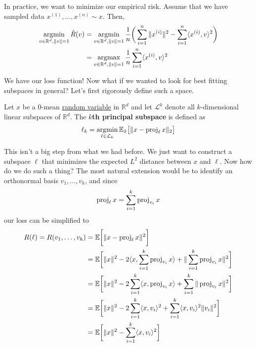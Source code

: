   In practice, we want to minimize our empirical risk. Assume that we have sampled data $x^{(1)}, \ldots, x^{(n)} \sim x$. Then, 
  \begin{align} 
    \operatorname*{\arg\!\min}_{v \in \mathbb{R}^{d}, \|v\| = 1} \hat{R}(v) 
    & =  \operatorname*{\arg\!\min}_{v \in \mathbb{R}^{d}, \|v\| = 1} \frac{1}{n} \bigg( \sum_{i = 1}^n \|x^{(i)} \|^2 - \sum_{i=1}^n \langle x^{(i)}, v \rangle^2 \bigg) \\ 
    & = \operatorname*{\arg\!\max}_{v \in \mathbb{R}^{d}, \|v\| = 1} \frac{1}{n} \sum_{i=1}^n \langle x^{(i)}, v \rangle^2 
  \end{align} 

  We have our loss function! Now what if we wanted to look for best fitting subspaces in general? Let's first rigorously define such a space. 

  \begin{definition}
    \label{def:principal-subspace}
 
    Let $x$ be a $0$-mean \hyperref[prob-def:random-variable]{random variable} in $\mathbb{R}^d$ and let $\mathcal{L}^k$ denote all $k$-dimensional linear subspaces of $\mathbb{R}^d$. The \textbf{$k$th principal subspace} is defined as 
    \begin{equation}
      \ell_k = \operatorname*{\arg\!\min}_{\ell \in \mathcal{L}_k} \mathbb{E}_{\Tilde{x}} \big[ \| x - \operatorname{proj}_\ell x\|_2 \big]
    \end{equation}
  \end{definition}

  This isn't a big step from what we had before. We just want to construct a subspace $\ell$ that minimizes the expected $L^2$ distance between $x$ and $\ell$. Now how do we do such a thing? The most natural extension would be to identify an orthonormal basis $v_1, \ldots, v_k$, and since 
  \begin{equation}
    \operatorname{proj}_\ell x = \sum_{i=1}^k \operatorname{proj}_{v_i} x
  \end{equation} 
  our loss can be simplified to 
  \begin{align}
    R(\ell) = R(v_1, \ldots, v_k) 
    & = \mathbb{E} \bigg[ \| x - \operatorname{proj}_\ell x \|^2 \bigg] \\ 
    & = \mathbb{E} \bigg[ \|x\|^2 - 2 \langle x, \sum_{i=1}^k \operatorname{proj}_{v_i} x \rangle + \| \sum_{i=1}^k \operatorname{proj}_{v_i} x \|^2 \bigg] \\ 
    & = \mathbb{E} \bigg[ \|x\|^2 - 2 \sum_{i=1}^k \langle x, \operatorname{proj}_{v_i} x \rangle + \sum_{i=1}^k \| \operatorname{proj}_{v_i} x \|^2 \bigg] \\
    & = \mathbb{E} \bigg[ \|x\|^2 - 2 \sum_{i=1}^k \langle x, v_i \rangle^2 + \sum_{i=1}^k \langle x, v_i \rangle^2 \|v_i\|^2 \bigg] \\ 
    & = \mathbb{E} \bigg[ \|x\|^2 - \sum_{i=1}^k \langle x, v_i \rangle^2 \bigg] \label{loss}
  \end{align} 

